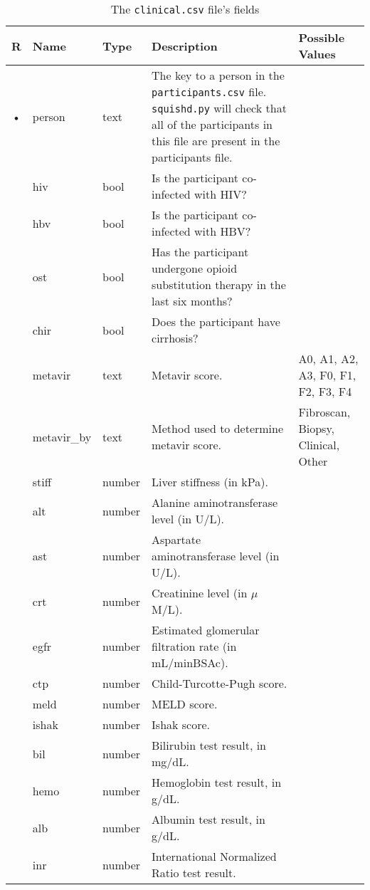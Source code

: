 \documentclass{article}
\begin{document}
\begin{table}
  \centering
  \caption{The \texttt{clinical.csv} file's fields}
  \label{tbl:clinical.csv}
  \begin{tabular}{cllp{6cm}p{4cm}}
    R & Name        & Type      & Description & Possible Values\\ \hline
  • & person      & text    & The key to a person in the \texttt{participants.csv}
    file. \texttt{squishd.py} will check that all of the participants in this file
    are present in the participants file. \\
    & hiv           & bool      & Is the participant co-infected with HIV? & \\
    & hbv           & bool      & Is the participant co-infected with HBV? & \\
    & ost           & bool      & Has the participant undergone opioid substitution therapy in the last six months? &  \\
    & chir          & bool      & Does the participant have cirrhosis? & \\
    & metavir       & text      & Metavir score. & A0, A1, A2, A3, F0, F1, F2, F3, F4 \\
    & metavir\_by   & text      & Method used to determine metavir score. & Fibroscan, Biopsy, Clinical, Other \\
    & stiff         & number    & Liver stiffness (in kPa). & \\
    & alt           & number    & Alanine aminotransferase level (in U/L). & \\
    & ast           & number    & Aspartate aminotransferase level (in U/L). & \\
    & crt           & number    & Creatinine level (in $\mu$M/L). & \\
    & egfr          & number    & Estimated glomerular filtration rate (in mL/minBSAc). & \\
    & ctp           & number    & Child-Turcotte-Pugh score. & \\
    & meld          & number    & MELD score. & \\
    & ishak         & number    & Ishak score. & \\
    & bil           & number    & Bilirubin test result, in mg/dL. & \\
    & hemo          & number    & Hemoglobin test result, in g/dL. & \\
    & alb           & number    & Albumin test result, in g/dL. & \\
    & inr           & number    & International Normalized Ratio test result. & \\

\end{tabular}
\end{table}
\end{document}
